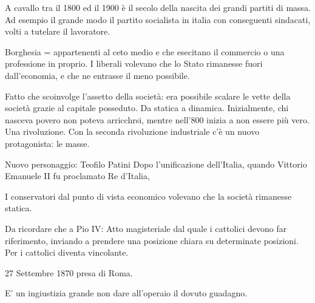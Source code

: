 \documentclass{article}
\begin{document}
    A cavallo tra il 1800 ed il 1900 è il secolo della nascita dei grandi partiti di massa. Ad esempio il grande modo il partito socialista in italia con conseguenti sindacati, volti a tutelare il lavoratore.

    Borghesia = appartenenti al ceto medio e che esecitano il commercio o una professione in proprio. I liberali volevano che lo Stato rimanesse fuori dall'economia, e che ne entrasse il meno possibile.

    Fatto che scoinvolge l'assetto della società: era possibile scalare le vette della società grazie al capitale posseduto. Da statica a dinamica. Inizialmente, chi nasceva povero non poteva arricchrsi, mentre nell'800 inizia a non essere più vero. Una rivoluzione.
    Con la seconda rivoluzione industriale c'è un nuovo protagonista: le masse.

    Nuovo personaggio: Teofilo Patini
    Dopo l'unificazione dell'Italia, quando Vittorio Emanuele II fu proclamato Re d'Italia, 

    I conservatori dal punto di vista economico volevano che la società rimanesse statica.

    Da ricordare che a Pio IV: Atto magisteriale dal quale i cattolici devono far riferimento, inviando a prendere una posizione chiara su determinate posizioni. Per i cattolici diventa vincolante.

    27 Settembre 1870 presa di Roma.

    E' un ingiustizia grande non dare all'operaio il dovuto guadagno.
\end{document}

